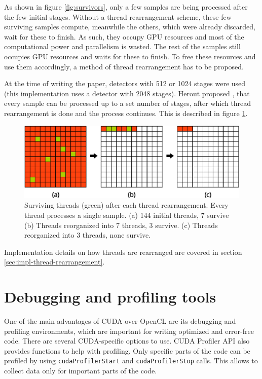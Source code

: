 As shown in figure \ref{fig:survivors}, only a few samples are being processed after the few initial stages. Without a thread rearrangement scheme, these few surviving samples compute, meanwhile the others, which were already discarded, wait for these to finish. As such, they occupy GPU resources and most of the computational power and parallelism is wasted. The rest of the samples still occupies GPU resources and waits for these to finish. To free these resources and use them accordingly, a method of thread rearrangement has to be proposed.

At the time of writing the paper, detectors with 512 or 1024 stages were used (this implementation uses a detector with 2048 stages). Herout proposed \cite{herout2011real}, that every sample can be processed up to a set number of stages, after which thread rearrangement is done and the process continues. This is described in figure \ref{fig:thread-rearrangement}.

\begin{center}
\begin{figure}[ht]
	\centering\includegraphics[width=0.75\linewidth]{fig/thread-rearrangement.eps}
	\caption{Surviving threads (green) after each thread rearrangement. Every thread processes a single sample. (a) 144 initial threads, 7 survive (b) Threads reorganized into 7 threads, 3 survive. (c) Threads reorganized into 3 threads, none survive.}
	\label{fig:thread-rearrangement}
\end{figure}
\end{center}

Implementation details on how threads are rearranged are covered in section \ref{sec:impl-thread-rearrangement}.

\section{Debugging and profiling tools}\label{sec:debugging-and-profiling}

One of the main advantages of CUDA over OpenCL are its debugging and profiling environments, which are important for writing optimized and error-free code. There are several CUDA-specific options to use. CUDA Profiler API also provides functions to help with profiling. Only specific parts of the code can be profiled by using \verb|cudaProfilerStart| and \verb|cudaProfilerStop| calls. This allows to collect data only for important parts of the code.


